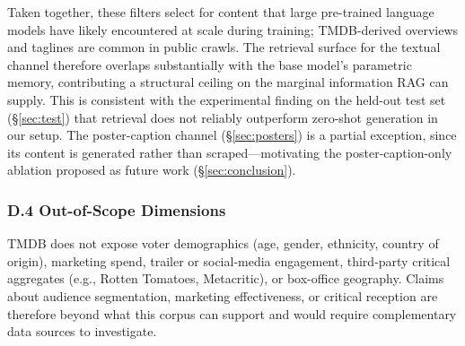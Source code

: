 \documentclass[10pt,twocolumn]{article}
\begin{document}
Taken together, these filters select for content that large
pre-trained language models have likely encountered at scale
during training; TMDB-derived overviews and taglines are common
in public crawls. The retrieval surface for the textual channel
therefore overlaps substantially with the base model's
parametric memory, contributing a structural ceiling on the
marginal information RAG can supply. This is consistent with
the experimental finding on the held-out test set
(\S\ref{sec:test}) that retrieval does not reliably outperform
zero-shot generation in our setup. The poster-caption channel
(\S\ref{sec:posters}) is a partial exception, since its content
is generated rather than scraped---motivating the
poster-caption-only ablation proposed as future work
(\S\ref{sec:conclusion}).

\subsubsection*{D.4 Out-of-Scope Dimensions}

TMDB does not expose voter demographics (age, gender, ethnicity,
country of origin), marketing spend, trailer or social-media
engagement, third-party critical aggregates (e.g., Rotten
Tomatoes, Metacritic), or box-office geography. Claims about
audience segmentation, marketing effectiveness, or critical
reception are therefore beyond what this corpus can support and
would require complementary data sources to investigate.
\end{document}
